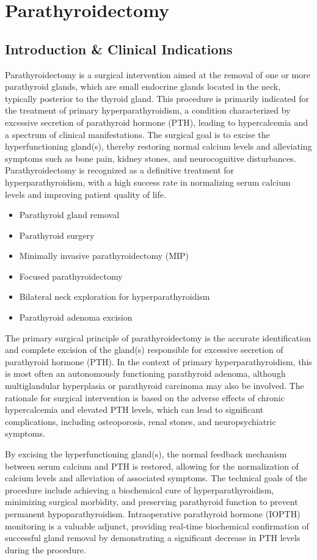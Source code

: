 \chapter{Parathyroidectomy}

\section*{Introduction \& Clinical Indications}
Parathyroidectomy is a surgical intervention aimed at the removal of one or more parathyroid glands, which are small endocrine glands located in the neck, typically posterior to the thyroid gland. This procedure is primarily indicated for the treatment of primary hyperparathyroidism, a condition characterized by excessive secretion of parathyroid hormone (PTH), leading to hypercalcemia and a spectrum of clinical manifestations. The surgical goal is to excise the hyperfunctioning gland(s), thereby restoring normal calcium levels and alleviating symptoms such as bone pain, kidney stones, and neurocognitive disturbances. Parathyroidectomy is recognized as a definitive treatment for hyperparathyroidism, with a high success rate in normalizing serum calcium levels and improving patient quality of life.

\begin{itemize}
  \item Parathyroid gland removal
  \item Parathyroid surgery
  \item Minimally invasive parathyroidectomy (MIP)
  \item Focused parathyroidectomy
  \item Bilateral neck exploration for hyperparathyroidism
  \item Parathyroid adenoma excision
\end{itemize}

The primary surgical principle of parathyroidectomy is the accurate identification and complete excision of the gland(s) responsible for excessive secretion of parathyroid hormone (PTH). In the context of primary hyperparathyroidism, this is most often an autonomously functioning parathyroid adenoma, although multiglandular hyperplasia or parathyroid carcinoma may also be involved. The rationale for surgical intervention is based on the adverse effects of chronic hypercalcemia and elevated PTH levels, which can lead to significant complications, including osteoporosis, renal stones, and neuropsychiatric symptoms.

By excising the hyperfunctioning gland(s), the normal feedback mechanism between serum calcium and PTH is restored, allowing for the normalization of calcium levels and alleviation of associated symptoms. The technical goals of the procedure include achieving a biochemical cure of hyperparathyroidism, minimizing surgical morbidity, and preserving parathyroid function to prevent permanent hypoparathyroidism. Intraoperative parathyroid hormone (IOPTH) monitoring is a valuable adjunct, providing real-time biochemical confirmation of successful gland removal by demonstrating a significant decrease in PTH levels during the procedure.

